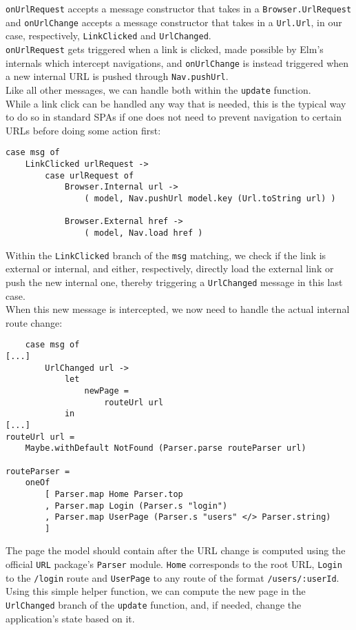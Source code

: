 \texttt{onUrlRequest} accepts a message constructor that takes in a \texttt{Browser.UrlRequest} and \texttt{onUrlChange} accepts a message constructor that takes in a \texttt{Url.Url}, in our case, respectively, \texttt{LinkClicked} and \texttt{UrlChanged}.\\
\texttt{onUrlRequest} gets triggered when a link is clicked, made possible by Elm's internals which intercept navigations, and \texttt{onUrlChange} is instead triggered when a new internal URL is pushed through \texttt{Nav.pushUrl}.\\
Like all other messages, we can handle both within the \texttt{update} function.\\

While a link click can be handled any way that is needed, this is the typical way to do so in standard SPAs if one does not need to prevent navigation to certain URLs before doing some action first\cite{noauthor_navigation_nodate}:
\begin{verbatim}
case msg of
    LinkClicked urlRequest ->
        case urlRequest of
            Browser.Internal url ->
                ( model, Nav.pushUrl model.key (Url.toString url) )

            Browser.External href ->
                ( model, Nav.load href )
\end{verbatim}

Within the \texttt{LinkClicked} branch of the \texttt{msg} matching, we check if the link is external or internal, and either, respectively, directly load the external link or push the new internal one, thereby triggering a \texttt{UrlChanged} message in this last case.\\
When this new message is intercepted, we now need to handle the actual internal route change:
\begin{verbatim}
    case msg of
[...]
        UrlChanged url ->
            let
                newPage =
                    routeUrl url
            in
[...]
routeUrl url =
    Maybe.withDefault NotFound (Parser.parse routeParser url)
    
routeParser =
    oneOf
        [ Parser.map Home Parser.top
        , Parser.map Login (Parser.s "login")
        , Parser.map UserPage (Parser.s "users" </> Parser.string)
        ]
\end{verbatim}
The page the model should contain after the URL change is computed using  the official \texttt{URL} package's \texttt{Parser} module. \texttt{Home} corresponds to the root URL, \texttt{Login} to the \texttt{/login} route and \texttt{UserPage} to any route of the format \texttt{/users/:userId}.\\
Using this simple helper function, we can compute the new page in the \texttt{UrlChanged} branch of the \texttt{update} function, and, if needed, change the application's state based on it.

